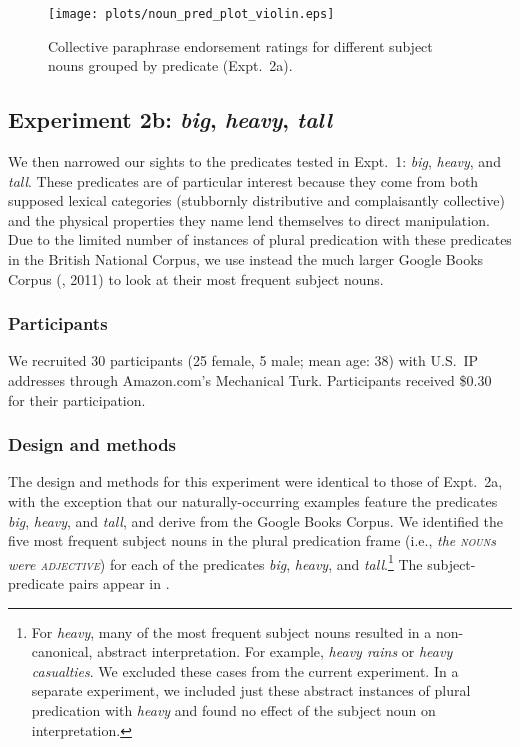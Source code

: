 \documentclass[preprint,12pt,authoryear,titlepage]{elsarticle}
\begin{document}
\begin{figure}[h!]
	\centering
	\texttt{[image: plots/noun\_pred\_plot\_violin.eps]}
	\caption{Collective paraphrase endorsement ratings for different subject nouns grouped by predicate (Expt.~2a).} \label{noun-pred-coll}
\end{figure}


\subsection{Experiment 2b: \emph{big}, \emph{heavy}, \emph{tall}}

We then narrowed our sights to the predicates tested in Expt.~1: \emph{big}, \emph{heavy}, and \emph{tall}. These predicates are of particular interest because they come from both supposed lexical categories (stubbornly distributive and complaisantly collective) and the physical properties they name lend themselves to direct manipulation.
Due to the limited number of instances of plural predication with these predicates in the British National Corpus, we use instead the much larger Google Books Corpus (\citeauthor{davies2011}, 2011) to look at their most frequent subject nouns.

\subsubsection{Participants}

We recruited 30 participants (25 female, 5 male; mean age: 38) with U.S.~IP addresses through Amazon.com's Mechanical Turk. Participants received \$0.30 for their participation.

\subsubsection{Design and methods}

The design and methods for this experiment were identical to those of Expt.~2a, with the exception that our naturally-occurring examples feature the predicates \emph{big}, \emph{heavy}, and \emph{tall}, and derive from the Google Books Corpus. We identified the five most frequent subject nouns in the plural predication frame (i.e., \emph{the \textsc{noun}s were \textsc{adjective}}) for each of the predicates \emph{big}, \emph{heavy}, and \emph{tall}.\footnote{For \emph{heavy}, many of the most frequent subject nouns resulted in a non-canonical, abstract interpretation. For example, \emph{heavy rains} or \emph{heavy casualties}. We excluded these cases from the current experiment. In a separate experiment, we included just these abstract instances of plural predication with \emph{heavy} and found no effect of the subject noun on interpretation.} The subject-predicate pairs appear in \Next.
\end{document}
